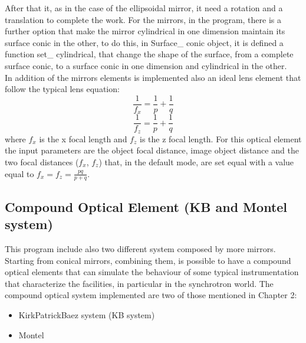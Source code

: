 %
After that it, as in the case of the ellipsoidal mirror, it need a rotation and a translation to complete the work.
For the mirrors, in the program, there is a further option that make the mirror cylindrical in one dimension maintain its surface conic in the other, to do this, in Surface\_ conic object, it is defined a function set\_ cylindrical, that change the shape of the surface, from a complete surface conic, to a surface conic in one dimension and cylindrical in the other.
\\
In addition of the mirrors elements is implemented also an ideal lens element that follow the typical lens equation:
\begin{equation}
		\frac{1}{f_x} = \frac{1}{p} + \frac{1}{q}
		\label{eq: lens equation1}
\end{equation}
\begin{equation}
		\frac{1}{f_z} = \frac{1}{p} + \frac{1}{q}
		\label{eq: lens equation2}
\end{equation}
where $f_x $ is the x focal length and $f_z $ is the z focal length. For this optical element the input parameters are the object focal distance, image object distance and the two focal distances ($f_x $, $f_z $) that, in the default mode, are set equal with a value equal to $f_x = f_z = \frac{pq}{p+q} $.

\subsection{Compound Optical Element (KB and Montel system)}

This program include also two different system composed by more mirrors. Starting from conical mirrors, combining them, is possible to have a compound optical elements that can simulate the behaviour of some typical instrumentation that characterize the facilities, in particular in the synchrotron world. The compound optical system implemented are two of those mentioned in Chapter 2:
\begin{itemize}
\item KirkPatrickBaez system (KB system)
\item Montel
\end{itemize}

